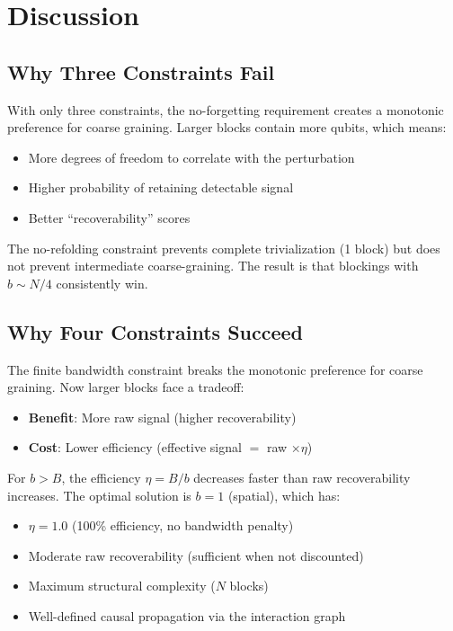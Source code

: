 \documentclass[11pt]{article}
\begin{document}
\section{Discussion}

\subsection{Why Three Constraints Fail}

With only three constraints, the no-forgetting requirement creates a monotonic 
preference for coarse graining. Larger blocks contain more qubits, which means:
\begin{itemize}
    \item More degrees of freedom to correlate with the perturbation
    \item Higher probability of retaining detectable signal
    \item Better ``recoverability'' scores
\end{itemize}

The no-refolding constraint prevents complete trivialization (1 block) but does 
not prevent intermediate coarse-graining. The result is that blockings with 
$b \sim N/4$ consistently win.

\subsection{Why Four Constraints Succeed}

The finite bandwidth constraint breaks the monotonic preference for coarse graining. 
Now larger blocks face a tradeoff:
\begin{itemize}
    \item \textbf{Benefit}: More raw signal (higher recoverability)
    \item \textbf{Cost}: Lower efficiency (effective signal $= $ raw $\times \eta$)
\end{itemize}

For $b > B$, the efficiency $\eta = B/b$ decreases faster than raw recoverability 
increases. The optimal solution is $b = 1$ (spatial), which has:
\begin{itemize}
    \item $\eta = 1.0$ (100\% efficiency, no bandwidth penalty)
    \item Moderate raw recoverability (sufficient when not discounted)
    \item Maximum structural complexity ($N$ blocks)
    \item Well-defined causal propagation via the interaction graph
\end{itemize}
\end{document}
